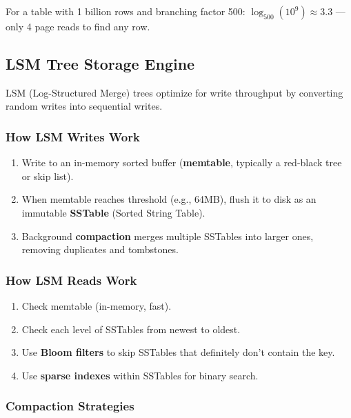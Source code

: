 \documentclass[12pt,a4paper]{article}
\begin{document}
For a table with 1 billion rows and branching factor 500: $\log_{500}(10^9) \approx 3.3$ --- only 4 page reads to find any row.

\subsection{LSM Tree Storage Engine}

LSM (Log-Structured Merge) trees optimize for write throughput by converting random writes into sequential writes.

\subsubsection{How LSM Writes Work}

\begin{enumerate}
    \item Write to an in-memory sorted buffer (\textbf{memtable}, typically a red-black tree or skip list).
    \item When memtable reaches threshold (e.g., 64MB), flush it to disk as an immutable \textbf{SSTable} (Sorted String Table).
    \item Background \textbf{compaction} merges multiple SSTables into larger ones, removing duplicates and tombstones.
\end{enumerate}

\subsubsection{How LSM Reads Work}

\begin{enumerate}
    \item Check memtable (in-memory, fast).
    \item Check each level of SSTables from newest to oldest.
    \item Use \textbf{Bloom filters} to skip SSTables that definitely don't contain the key.
    \item Use \textbf{sparse indexes} within SSTables for binary search.
\end{enumerate}

\subsubsection{Compaction Strategies}
\end{document}
